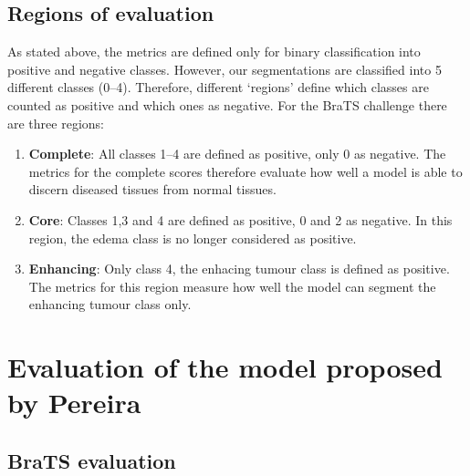 \documentclass[12pt,a4paper,twoside,openright]{report}
\begin{document}
\subsection{Regions of evaluation}
As stated above, the metrics are defined only for binary classification into positive and negative classes. However, our segmentations are classified into 5 different classes (0--4). Therefore, different `regions' define which classes are counted as positive and which ones as negative. For the BraTS challenge there are three regions:
\begin{enumerate}
	\item \textbf{Complete}: All classes 1--4 are defined as positive, only 0 as negative. The metrics for the complete scores therefore evaluate how well a model is able to discern diseased tissues from normal tissues.
	\item \textbf{Core}: Classes 1,3 and 4 are defined as positive, 0 and 2 as negative. In this region, the edema class is no longer considered as positive.
	\item \textbf{Enhancing}: Only class 4, the enhacing tumour class is defined as positive. The metrics for this region measure how well the model can segment the enhancing tumour class only.
\end{enumerate}


\section{Evaluation of the model proposed by Pereira}
\subsection{BraTS evaluation}
\end{document}
